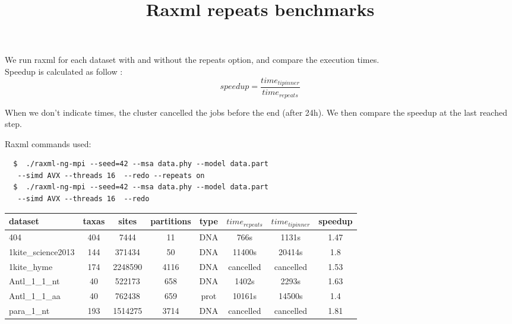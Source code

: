 \documentclass[a4paper]{article}
\begin{document}
\newcommand*{\figuretitle}[1]{%
    {\centering%
    \textbf{#1}%
    \par\medskip}%
}


\title{Raxml repeats benchmarks}
\maketitle

\noindent We run raxml for each dataset with and without the repeats option, and compare the execution times.\\


\noindent Speedup is calculated as follow :  
$$ speedup = \frac{time_{tipinner}}{time_{repeats}}$$

When we don't indicate times, the cluster cancelled the jobs before the end (after 24h). We then compare the speedup at the last reached step. \newline

Raxml commands used:
\lstset{language=sh}
\begin{lstlisting}
  $  ./raxml-ng-mpi --seed=42 --msa data.phy --model data.part
   --simd AVX --threads 16  --redo --repeats on
  $  ./raxml-ng-mpi --seed=42 --msa data.phy --model data.part
   --simd AVX --threads 16  --redo
\end{lstlisting}


\begin{tabular}{|l|c|c|c|c|c|c|c|}
\hline dataset                    & taxas & sites    & partitions & type & $time_{repeats}$ & $time_{tipinner}$ & speedup\\
\hline 404                        & 404   &  7444    & 11         & DNA  & 766s             &  1131s            & 1.47  \\
\hline 1kite\_science2013         & 144   &  371434  & 50         & DNA  & 11400s           &  20414s           & 1.8  \\
\hline 1kite\_hyme                & 174   &  2248590 & 4116       & DNA  & cancelled        &  cancelled        & 1.53 \\
\hline Antl\_1\_1\_nt             & 40    &  522173  & 658        & DNA  & 1402s            &  2293s            & 1.63  \\
\hline Antl\_1\_1\_aa             & 40    &  762438  & 659        & prot & 10161s           & 14500s            & 1.4 \\
\hline para\_1\_nt                & 193   &  1514275 & 3714       & DNA  & cancelled        &  cancelled        & 1.81  \\
\hline 
\end{tabular}\newline
\newline



\end{document}
